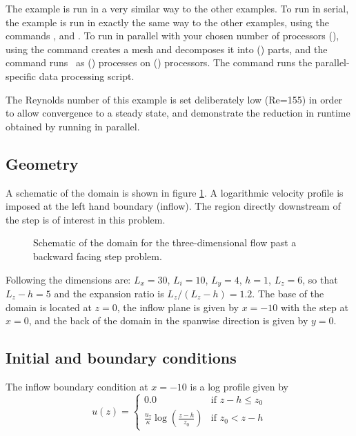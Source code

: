 The example is run in a very similar way to the other examples.
To run in serial, the example is run in exactly the same way to the other examples, using
the commands ,  and .
To run in parallel with your chosen number of processors (), using the command
 creates a mesh and decomposes it into () parts, and
the command  runs \fluidity\ as () processes on () processors.
The command  runs the parallel-specific data processing script.

The Reynolds number of this example is set deliberately low (Re=155) in order to
allow convergence to a steady state, and demonstrate the reduction in runtime obtained
by running in parallel.

\subsection{Geometry}
A schematic of the domain is shown in figure \ref{Fig:Schematic3d}.
A logarithmic velocity profile is imposed at the left hand boundary (inflow).
The region directly downstream of the step is of interest in this problem.

\begin{figure}
\centering
{}
\caption{Schematic of the domain for the three-dimensional flow past a backward facing step
problem.}
\label{Fig:Schematic3d}
\end{figure}

Following \cite{le1997} the dimensions are: $L_x=30$, $L_i=10$, $L_y=4$, $h=1$, $L_z=6$,
so that $L_z-h=5$ and the expansion ratio is $L_z/(L_z-h)=1.2$.
The base of the domain is located at $z=0$, the inflow plane is given by $x=-10$ with the step
at $x=0$, and the back of the domain in the spanwise direction is given by $y=0$.

\subsection{Initial and boundary conditions}
The inflow boundary condition at $x=-10$ is a log profile given by
\begin{equation*}
u(z) =
  \begin{cases}
    0.0 & \text{if } z-h \leq z_0 \\
    \frac{u_{\tau}}{\kappa} \log \left(\frac{z - h}{z_0}\right) & \text{if } z_0 < z-h
  \end{cases}
\end{equation*}

